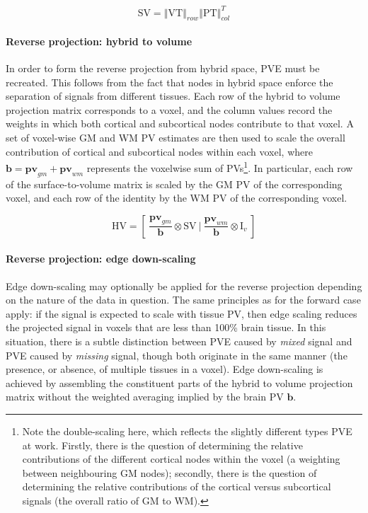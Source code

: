 \documentclass[review]{elsarticle}
\newcommand{\mat}[1]{\mathrm{#1}}
\renewcommand{\vec}[1]{\mathbf{#1}}
\begin{document}
\begin{equation}
\mathrm{SV} =  \left\Vert \mat{VT} \right\Vert_{row} \left\Vert \mat{PT} \right\Vert_{col}^T
\end{equation}

\paragraph{Reverse projection: hybrid to volume}

In order to form the reverse projection from hybrid space, PVE must be recreated. This follows from the fact that nodes in hybrid space enforce the separation of signals from different tissues. Each row of the hybrid to volume projection matrix corresponds to a voxel, and the column values record the weights in which both cortical and subcortical nodes contribute to that voxel. A set of voxel-wise GM and WM PV estimates are then used to scale the overall contribution of cortical and subcortical nodes within each voxel, where $\vec{b} = \vec{pv}_{gm} + \vec{pv}_{wm}$ represents the voxelwise sum of PVs\footnote{Note the double-scaling here, which reflects the slightly different types PVE at work. Firstly, there is the question of determining the relative contributions of the different cortical nodes within the voxel (a weighting between neighbouring GM nodes); secondly, there is the question of determining the relative contributions of the cortical versus subcortical signals (the overall ratio of GM to WM).}. In particular, each row of the surface-to-volume matrix is scaled by the GM PV of the corresponding voxel, and each row of the identity by the WM PV of the corresponding voxel. 

\begin{equation}
\mathrm{HV} = [\ \frac{\vec{pv}_{gm}}{\vec{b}} \otimes \mat{SV} \ | \ \frac{\vec{pv}_{wm}}{\vec{b}} \otimes \mat{I}_v \ ]
\end{equation}

\paragraph{Reverse projection: edge down-scaling}

Edge down-scaling may optionally be applied for the reverse projection depending on the nature of the data in question. The same principles as for the forward case apply: if the signal is expected to scale with tissue PV, then edge scaling reduces the projected signal in voxels that are less than 100\% brain tissue. In this situation, there is a subtle distinction between PVE caused by \textit{mixed} signal and PVE caused by \textit{missing} signal, though both originate in the same manner (the presence, or absence, of multiple tissues in a voxel). Edge down-scaling is achieved by assembling the constituent parts of the hybrid to volume projection matrix without the weighted averaging implied by the brain PV $\vec{b}$. 
\end{document}
